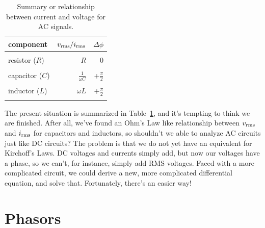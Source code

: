 \documentclass[12pt,oneside]{book}
\begin{document}
\begin{table}
\caption{Summary or relationship between current and voltage for AC signals.}
\label{tbl:rmsimp}
\begin{center}
\begin{tabular}{lrr}
component & $v_{\rm rms} / i_{\rm rms} $ & $\Delta \phi$ \\
\hline
\\
resistor ($R$) & $R$ & $0$ \\
\\
capacitor ($C$) & $\displaystyle \frac{1}{\omega C}$ & +$\displaystyle \frac{\pi}{2}$ \\
\\
inductor ($L$) & $\omega L$ & $\displaystyle +\frac{\pi}{2}$ \\
\\
\end{tabular}
\end{center}
\end{table}

The present situation is summarized in Table~\ref{tbl:rmsimp}, and it's tempting to think we are finished.
After all, we've found an Ohm's Law like relationship between $v_{\rm rms}$ and $i_{\rm rms}$ for capacitors and inductors, so shouldn't we able to analyze AC circuits just like DC circuits?  The problem is that we do not yet have an equivalent for Kirchoff's Laws.  DC voltages and currents simply add, but now our voltages have a phase, so we can't, for instance, simply add RMS voltages.  Faced with a more complicated circuit, we could derive a new, more complicated differential equation, and solve that.  Fortunately, there's an easier way!

\section{Phasors}
\end{document}
